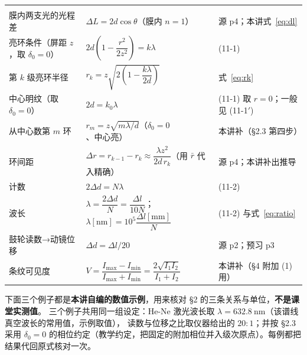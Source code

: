\documentclass[11pt]{ctexart}
\newcommand{\Dl}{d}
\begin{document}

{\small
\begin{longtable}{@{}L{4.1cm}L{8.1cm}L{3.1cm}@{}}
\toprule
{} &  &  \\
\midrule
\endfirsthead
\toprule
{} &  &  \\
\midrule
\endhead
\bottomrule
\endlastfoot
膜内两支光的光程差 & $\Delta L=2\Dl\cos\theta$（膜内 $n=1$） & 源 p4；本讲式~\eqref{eq:dl} \\
亮环条件（屏距 $z$，取 $\delta_0=0$） & $2\Dl\left(1-\dfrac{r^2}{2z^2}\right)=k\lambda$ & (11-1) \\
第 $k$ 级亮环半径 & $r_k=z\sqrt{2\left(1-\dfrac{k\lambda}{2\Dl}\right)}$ & 式~\eqref{eq:rk} \\
中心明纹（取 $\delta_0=0$） & $2\Dl=k_0\lambda$ & (11-1) 取 $r=0$；一般见 (11-1$'$) \\
从中心数第 $m$ 环 & $r_m=z\sqrt{m\lambda/\Dl}$（$\delta_0=0$、中心亮） & 本讲补（§2.3 第四步） \\
环间距 & $\Delta r=r_{k-1}-r_k\approx\dfrac{\lambda z^2}{2\Dl\,r_k}$（用 $\bar r$ 代入精确） & 源 p4；本讲补出推导 \\
计数 & $2\Delta\Dl=N\lambda$ & (11-2) \\
波长 & $\lambda=\dfrac{2\Delta\Dl}{N}=\dfrac{\Delta l}{10N}$；$\lambda[\mathrm{nm}]=10^{5}\dfrac{\Delta l[\mathrm{mm}]}{N}$ & (11-2) 与式~\eqref{eq:ratio} \\
鼓轮读数→动镜位移 & $\Delta\Dl=\Delta l/20$ & 源 p2；预习 p3 \\
条纹可见度 & $V=\dfrac{I_{\max}-I_{\min}}{I_{\max}+I_{\min}}=\dfrac{2\sqrt{I_1I_2}}{I_1+I_2}$ & 本讲补（§4 附加 (1) 用） \\
\end{longtable}}


下面三个例子都是\textbf{本讲自编的数值示例}，用来核对 §2 的三条关系与单位，\textbf{不是课堂实测值}。
三个例子共用同一组设定：He-Ne 激光波长取 $\lambda=632.8\ \mathrm{nm}$（该谱线真空波长的常用值，示例取值），
读数与位移之比取仪器给出的 $20:1$；并按 §2.3 采用 $\delta_0=0$ 的相位约定（教学约定，把固定的附加相位并入级次原点）。每例都把结果代回原式核对一次。

\end{document}
